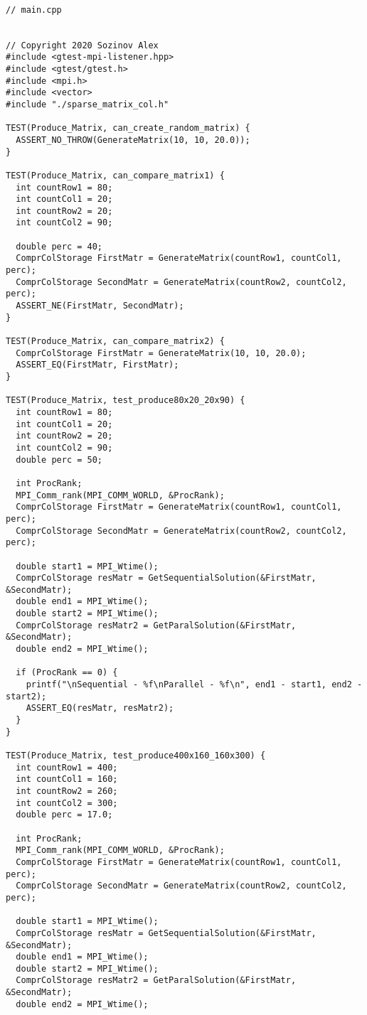 \documentclass{report}
\begin{document}
\begin{lstlisting}

// main.cpp


// Copyright 2020 Sozinov Alex
#include <gtest-mpi-listener.hpp>
#include <gtest/gtest.h>
#include <mpi.h>
#include <vector>
#include "./sparse_matrix_col.h"

TEST(Produce_Matrix, can_create_random_matrix) {
  ASSERT_NO_THROW(GenerateMatrix(10, 10, 20.0));
}

TEST(Produce_Matrix, can_compare_matrix1) {
  int countRow1 = 80;
  int countCol1 = 20;
  int countRow2 = 20;
  int countCol2 = 90;

  double perc = 40;
  ComprColStorage FirstMatr = GenerateMatrix(countRow1, countCol1, perc);
  ComprColStorage SecondMatr = GenerateMatrix(countRow2, countCol2, perc);
  ASSERT_NE(FirstMatr, SecondMatr);
}

TEST(Produce_Matrix, can_compare_matrix2) {
  ComprColStorage FirstMatr = GenerateMatrix(10, 10, 20.0);
  ASSERT_EQ(FirstMatr, FirstMatr);
}

TEST(Produce_Matrix, test_produce80x20_20x90) {
  int countRow1 = 80;
  int countCol1 = 20;
  int countRow2 = 20;
  int countCol2 = 90;
  double perc = 50;

  int ProcRank;
  MPI_Comm_rank(MPI_COMM_WORLD, &ProcRank);
  ComprColStorage FirstMatr = GenerateMatrix(countRow1, countCol1, perc);
  ComprColStorage SecondMatr = GenerateMatrix(countRow2, countCol2, perc);

  double start1 = MPI_Wtime();
  ComprColStorage resMatr = GetSequentialSolution(&FirstMatr, &SecondMatr);
  double end1 = MPI_Wtime();
  double start2 = MPI_Wtime();
  ComprColStorage resMatr2 = GetParalSolution(&FirstMatr, &SecondMatr);
  double end2 = MPI_Wtime();

  if (ProcRank == 0) {
    printf("\nSequential - %f\nParallel - %f\n", end1 - start1, end2 - start2);
    ASSERT_EQ(resMatr, resMatr2);
  }
}

TEST(Produce_Matrix, test_produce400x160_160x300) {
  int countRow1 = 400;
  int countCol1 = 160;
  int countRow2 = 260;
  int countCol2 = 300;
  double perc = 17.0;

  int ProcRank;
  MPI_Comm_rank(MPI_COMM_WORLD, &ProcRank);
  ComprColStorage FirstMatr = GenerateMatrix(countRow1, countCol1, perc);
  ComprColStorage SecondMatr = GenerateMatrix(countRow2, countCol2, perc);

  double start1 = MPI_Wtime();
  ComprColStorage resMatr = GetSequentialSolution(&FirstMatr, &SecondMatr);
  double end1 = MPI_Wtime();
  double start2 = MPI_Wtime();
  ComprColStorage resMatr2 = GetParalSolution(&FirstMatr, &SecondMatr);
  double end2 = MPI_Wtime();


\end{lstlisting}
\end{document}
